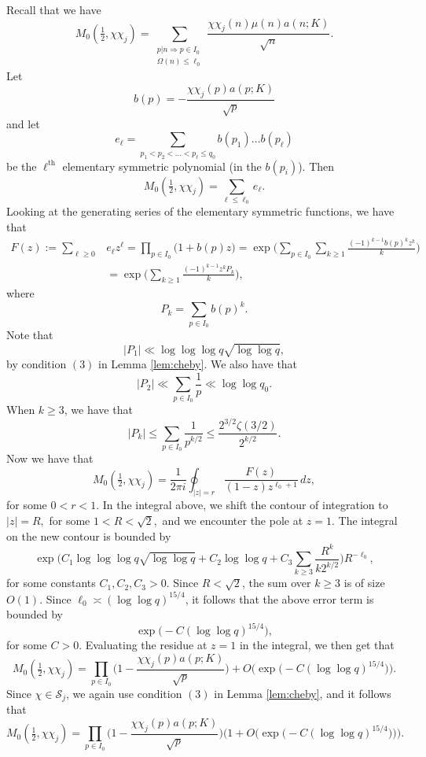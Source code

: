 \documentclass[12pt, reqno]{amsart}
\numberwithin{equation}{section}
\numberwithin{theorem}{section}
\numberwithin{equation}{section}
\begin{document}
Recall that we have $$M_0 (  \tfrac{1}{2},\chi \chi_j) = \sum_{\substack{p|n \Rightarrow p \in I_0 \\ \Omega(n) \leq \ell_0}} \frac{ \chi\chi_j(n)\mu(n)   a(n;K)}{\sqrt{n}} . $$
Let $$b(p) = -\frac{\chi \chi_j(p)a(p;K)}{\sqrt{p}} $$
and let $$ e_{\ell}= \sum_{p_1<p_2<\ldots<p_{\ell}\leq q_0} b(p_1) \ldots b(p_{\ell})$$ be the $\ell^{\text{th}}$ elementary symmetric polynomial (in the $b(p_i)$). 
Then
$$ M_0 (  \tfrac{1}{2},\chi \chi_j) = \sum_{\ell \leq \ell_0} e_{\ell}.$$
Looking at the generating series of the elementary symmetric functions, we have that
\begin{align*}
  F(z):=  \sum_{\ell \geq 0} & e_{\ell} z^{\ell} = \prod_{p \in I_0} \big(1+ b(p) z\big) =\exp \Big(  \sum_{p \in I_0} \sum_{k \geq 1} \frac{ (-1)^{k-1}b(p)^k z^k}{k}\Big) \\
    &= \exp \Big(  \sum_{k \geq 1} \frac{ (-1)^{k-1} z^k P_k}{k} \Big),
\end{align*}
where $$P_k = \sum_{p \in I_0} b(p)^k.$$
Note that
$$|P_1| \ll \log \log \log q\sqrt{\log \log q},$$ by condition $(3)$ in Lemma \ref{lem:cheby}. We also have that 
$$| P_2| \ll \sum_{p \in I_0} \frac{1}{p} \ll \log \log q_0. $$
When $k \geq 3$, we have that 
$$|P_k| \leq \sum_{p \in I_0} \frac{1}{p^{k/2}} \leq   \frac{2^{3/2} \zeta(3/2)}{2^{k/2}}.$$
Now we have that
$$M_0 ( \tfrac{1}{2},\chi \chi_j ) = \frac{1}{2 \pi i} \oint_{|z|=r} \frac{F(z)}{(1-z)z^{\ell_0+1}} \, dz,$$
for some $0<r<1$.
In the integral above, we shift the contour of integration to $|z|=R,$ for some $1<R<\sqrt{2},$ and we encounter the pole at $z=1$. The integral on the new contour is bounded by 
$$ \exp \Big(  C_1 \log \log \log q\sqrt{\log \log q} + C_2 \log  \log q + C_3 \sum_{k \geq 3} \frac{R^k}{k2^{k/2}}\Big) R^{-\ell_0},$$ for some constants $C_1,C_2,C_3>0$. Since $R<\sqrt{2}$, the sum over $k \geq 3$ is of size $O(1).$ Since $\ell_0 \asymp (\log \log q)^{15/4}$, it follows that the above error term is bounded by 
$$\exp \big(- C (\log \log q)^{15/4} \big),$$ for some $C>0$. Evaluating the residue at $z=1$ in the integral, we then get that
$$M_0 (  \tfrac{1}{2},\chi \chi_j )= \prod_{p \in I_0} \Big(1 - \frac{\chi \chi_j(p) a(p;K)}{\sqrt{p}} \Big)+O \Big( \exp \big(- C (\log \log q)^{15/4} \big)\Big). $$
Since $\chi \in \mathcal{S}_j$, we again use condition $(3)$ in Lemma \ref{lem:cheby}, and it follows that 
\begin{equation}\label{approxM0}
  M_0 (  \tfrac{1}{2},\chi \chi_j )= \prod_{p \in I_0} \Big(1 - \frac{\chi \chi_j(p) a(p;K)}{\sqrt{p}} \Big)\bigg(1+O \Big( \exp \big(- C (\log \log q)^{15/4} \big)\Big)\bigg). 
\end{equation}
\end{document}
